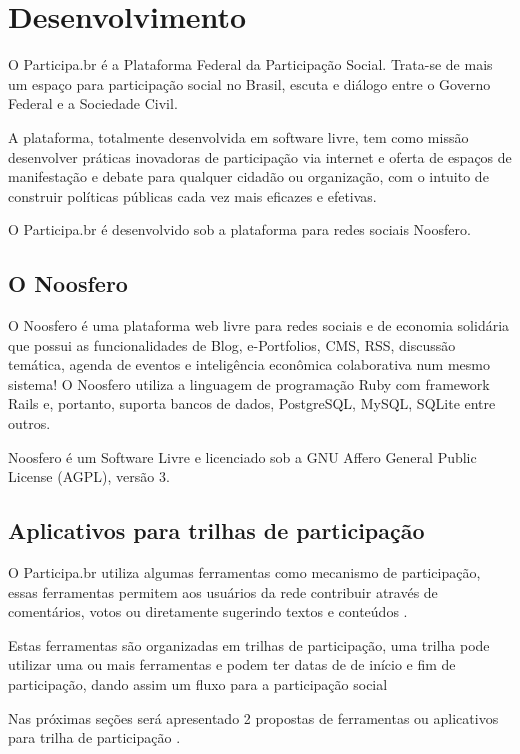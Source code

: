 \documentclass[12pt]{article}
\begin{document}
\section{Desenvolvimento}

O Participa.br é a Plataforma Federal da Participação Social. Trata-se de mais
um espaço para participação social no Brasil, escuta e diálogo entre o Governo
Federal e a Sociedade Civil. 

A plataforma, totalmente desenvolvida em software livre, tem como missão
desenvolver práticas inovadoras de participação via internet e oferta de
espaços de manifestação e debate para qualquer cidadão ou organização, com o
intuito de construir políticas públicas cada vez mais eficazes e efetivas.

O Participa.br é desenvolvido sob a plataforma para redes sociais Noosfero.

\subsection{O Noosfero}

O Noosfero é uma plataforma web livre para redes sociais e de economia
solidária que possui as funcionalidades de Blog, e-Portfolios, CMS, RSS,
discussão temática, agenda de eventos e inteligência econômica colaborativa
num mesmo sistema! O Noosfero utiliza a linguagem de programação Ruby com
framework Rails e, portanto, suporta bancos de dados, PostgreSQL, MySQL,
SQLite entre outros.

Noosfero é um Software Livre e licenciado sob a GNU Affero General Public
License (AGPL), versão 3\cite{wikipediaSingleSignOn}.

\subsection{Aplicativos para trilhas de participação}
 
O Participa.br utiliza algumas ferramentas como mecanismo de participação,
essas ferramentas permitem aos usuários da rede contribuir através de
comentários, votos ou diretamente sugerindo textos e conteúdos .

Estas ferramentas são organizadas em trilhas de participação, uma trilha
pode utilizar uma ou mais ferramentas e podem ter datas de de início e fim de
participação, dando assim um fluxo para a participação social 

Nas próximas seções será apresentado 2 propostas de ferramentas ou aplicativos
para trilha de participação .
\end{document}
